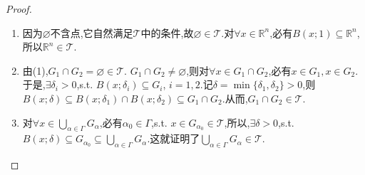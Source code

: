 \documentclass[../../main.tex]{subfiles}%
\begin{document}
\begin{proof}
\begin{enumerate}[(1)]
\item 因为$\varnothing$不含点,它自然满足$\mathscr{T}$中的条件,故$\varnothing\in\mathscr{T}$.对$\forall x\in\mathbb{R}^n$,必有$B(x;1)\subseteq\mathbb{R}^n$,所以$\mathbb{R}^n\in\mathscr{T}$.

\item \one 由(1),$G_1\cap G_2=\varnothing\in\mathscr{T}$.
\two $G_1\cap G_2\neq\varnothing$,则对$\forall x\in G_1\cap G_2$,必有$x\in G_1,x\in G_2$.于是,$\exists\delta_i>0$,s.t. $B(x;\delta_i)\subseteq G_i$, $i=1,2$.记$\delta=\min\{\delta_1,\delta_2\}>0$,则$B(x;\delta)\subseteq B(x;\delta_1)\cap B(x;\delta_2)\subseteq G_1\cap G_2$.从而,$G_1\cap G_2\in\mathscr{T}$.

\item 对$\forall x\in\bigcup_{\alpha\in\Gamma}G_\alpha$,必有$\alpha_0\in\Gamma$,s.t. $x\in G_{\alpha_0}\in\mathscr{T}$,所以,$\exists\delta>0$,s.t. $B(x;\delta)\subseteq G_{\alpha_0}\subseteq\bigcup_{\alpha\in\Gamma}G_\alpha$.这就证明了$\bigcup_{\alpha\in\Gamma}G_\alpha\in\mathscr{T}$.
\end{enumerate}


\end{proof}
\end{document}
